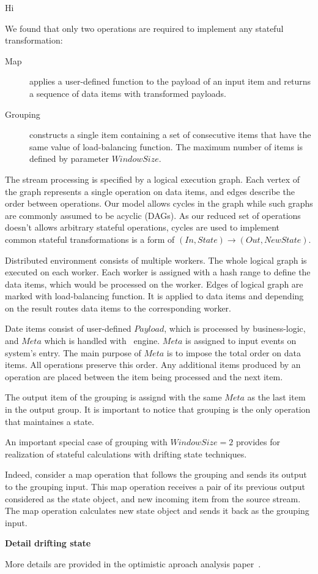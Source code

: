 \newpage
Hi
\newpage
\label {fs-short-model}

We found that only two operations are required to implement any stateful transformation:

\begin {description}
  \item [Map] applies a user-defined function to the payload of an input item and returns a sequence of data items with transformed payloads. 
  \item [Grouping] constructs a single item containing a set of consecutive items that have the same value of load-balancing function. The maximum number of items is defined by parameter $Window Size$. 
\end {description}

The stream processing is specified by a logical execution graph. Each vertex of the graph represents a single operation on data items, and edges describe the order between operations. Our model allows cycles in the graph while such graphs are commonly assumed to be acyclic (DAGs). As our reduced set of operations doesn't allows arbitrary stateful operations, cycles are used to implement common stateful transformations is a form of $(In, State) \rightarrow (Out, NewState)$.

Distributed environment consists of multiple workers. The whole logical graph is executed on each worker. Each worker is assigned with a hash range to define the data items, which would be processed on the worker. Edges of logical graph are marked with load-balancing function. It is applied to data items and depending on the result routes data items to the corresponding worker.

Date items consist of user-defined $Payload$, which is processed by business-logic, and $Meta$ which is handled with \FlameStream\ engine. $Meta$ is assigned to input events on system's entry. The main purpose of $Meta$ is to impose the total order on data items. All operations preserve this order. Any additional items produced by an operation are placed between the item being processed and the next item.


The output item of the grouping is assignd with the same $Meta$ as the last item in the output group. It is important to notice that grouping is the only operation that maintaines a state.

An important special case of grouping with $Window Size = 2$  provides for realization of stateful calculations with drifting state techniques.  

Indeed, consider a map operation that follows the grouping and sends its output to the grouping input. This map operation receives a pair of its previous output considered as the state object, and new incoming item from the source stream. The map operation calculates new state object and sends it back as the grouping input. 

{\bf Detail drifting state}

More details are provided in the optimistic aproach analysis paper~\cite{we2018seim}.
